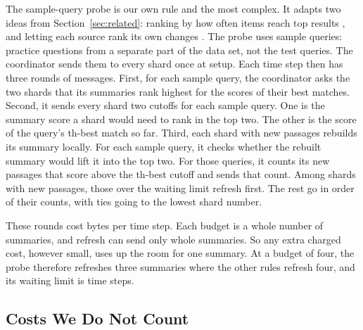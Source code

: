 The sample-query probe is our own rule and the most complex.
It adapts two ideas from Section~\ref{sec:related}: ranking by how often items reach top results \cite{pandey2008crawlorder}, and letting each source rank its own changes \cite{olston2002besteffort}.
The probe uses \RNumSampleQueries{} sample queries: practice questions from a separate part of the data set, not the test queries.
The coordinator sends them to every shard once at setup.
Each time step then has three rounds of messages.
First, for each sample query, the coordinator asks the two shards that its summaries rank highest for the scores of their \RNumPlainTopK{} best matches.
Second, it sends every shard two cutoffs for each sample query.
One is the summary score a shard would need to rank in the top two.
The other is the score of the query's \RNumPlainTopK{}th-best match so far.
Third, each shard with new passages rebuilds its summary locally.
For each sample query, it checks whether the rebuilt summary would lift it into the top two.
For those queries, it counts its new passages that score above the \RNumPlainTopK{}th-best cutoff and sends that count.
Among shards with new passages, those over the waiting limit refresh first.
The rest go in order of their counts, with ties going to the lowest shard number.

These rounds cost \RNumRNOverheadEpochBytes{} bytes per time step.
Each budget is a whole number of summaries, and refresh can send only whole summaries.
So any extra charged cost, however small, uses up the room for one summary.
At a budget of four, the probe therefore refreshes three summaries where the other rules refresh four, and its waiting limit is \RNumPlainCapRNBFour{} time steps.

\subsection{Costs We Do Not Count}

